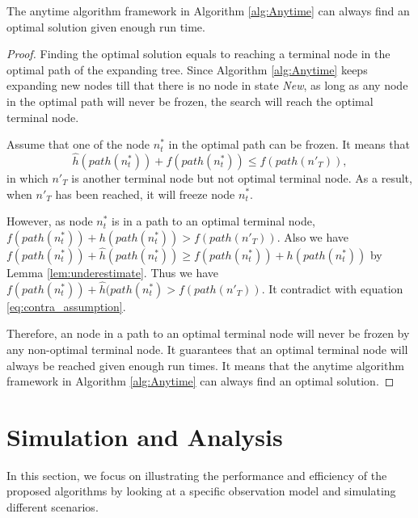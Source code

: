 \documentclass[12pt]{article}
\begin{document}
\begin{thm} 
\label{thm:optimal}
The anytime algorithm framework in Algorithm \ref{alg:Anytime} can always find an optimal solution given enough run time.
\begin{proof}

Finding the optimal solution equals to reaching a terminal node in the optimal path of the expanding tree.
Since Algorithm \ref{alg:Anytime} keeps expanding new nodes till that there is no node in state \emph{New}, as long as any node in the optimal path will never be frozen, the search will reach the optimal terminal node.

Assume that one of the node $ n^{*}_{t} $ in the optimal path can be frozen. It means that 
\begin{equation}
\label{eq:contra_assumption}
\hat{h}(path(n^{*}_{t})) + f(path(n^{*}_{t})) \leq f(path(n'_{T})),
\end{equation}
in which $ n'_{T} $ is another terminal node but not optimal terminal node.
As a result, when $ n'_{T} $ has been reached, it will freeze node $ n^{*}_{t} $. 

However, as node $ n^{*}_{t} $ is in a path to an optimal terminal node, $ f(path(n^{*}_{t})) + h(path(n^{*}_{t})) > f(path(n'_{T})) $.
Also we have $ f(path(n^{*}_{t})) + \hat{h}(path(n^{*}_{t})) \geq f(path(n^{*}_{t})) + h(path(n^{*}_{t})) $ by Lemma \ref{lem:underestimate}.
Thus we have $ f(path(n^{*}_{t})) + \hat{h}(path(n^{*}_{t}) > f(path(n'_{T})) $. It contradict with equation \eqref{eq:contra_assumption}.

Therefore, an node in a path to an optimal terminal node will never be frozen by any non-optimal terminal node.
It guarantees that an optimal terminal node will always be reached given enough run times.
It means that the anytime algorithm framework in Algorithm \ref{alg:Anytime} can always find an optimal solution.

\end{proof}
\end{thm}

\section{Simulation and Analysis}
\label{sec:simulation_and_analysis}

In this section, we focus on illustrating the performance and efficiency of the proposed algorithms by looking at a specific observation model and simulating different scenarios.
\end{document}
